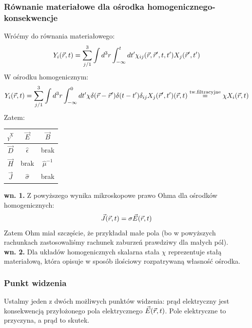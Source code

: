 \subsubsection{Równanie materiałowe dla ośrodka homogenicznego- konsekwencje}
Wróćmy do równania materiałowego:
\begin{equation} {Y}_i(\vec{r},t)=\sum_{j/1}^3 \int d^3r \int_{-\infty}^t dt' {\chi}_{ij}(\vec{r},\vec{r}',t,t') X_j(\vec{r}',t') \end{equation}
W ośrodku homogenicznym:
\begin{equation} {Y}_i(\vec{r},t)=\sum_{j/1}^3 \int d^3r \int_{-\infty}^0 dt' {\chi}\delta(\vec{r}-\vec{r}')\delta(t-t')\delta_{ij} X_j(\vec{r}',t')(\vec{r},t) 
\stackrel{\text{tw.filtracyjne}}{=}\chi X_i(\vec{r},t) \end{equation}
Zatem:\\
\begin{center}
\begin{tabular}{|c||c|c|}
  \hline
 ${_Y^{~~X}}$ & $\vec{E}$ & $\vec{B}$\\
  \hline\hline
  $\vec{D}$ &  $\hat{\epsilon}$ & brak \\
\hline
  $\vec{H}$ &  brak & $\hat{\mu}^{-1}$ \\
  \hline
  $\vec{J}$ &  $\hat{\sigma}$ &  brak\\
    \hline
\end{tabular} 
\end{center}
\textbf{wn. 1.} Z powyższego wynika mikroskopowe prawo Ohma dla ośrodków homogenicznych: \begin{equation} \vec{J}(\vec{r},t)=\sigma\vec{E}(\vec{r},t) \end{equation}
Zatem Ohm miał szczęście, że przykładał małe pola (bo w powyższych rachunkach zastosowaliśmy rachunek zaburzeń prawdziwy dla małych pól).\\
\textbf{wn. 2.} Dla układów homogenicznych skalarna stała $\chi$ reprezentuje stałą materiałową, która opisuje w sposób ilościowy rozpatrywaną własność ośrodka.
\subsubsection{Punkt widzenia}
Ustalmy jeden z dwóch możliwych punktów widzenia:
prąd elektryczny jest konsekwencją przyłożonego pola elektrycznego $\vec{E}(\vec{r},t)$. Pole elektryczne to przyczyna, a prąd to skutek.
